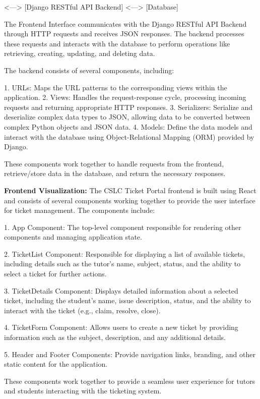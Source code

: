 \documentclass[oneside,openany,obeyspaces]{book}
\begin{document}
\begin{flushleft}
         <---> [Django RESTful API Backend] <---> [Database]

    The Frontend Interface communicates with the Django RESTful API Backend through HTTP requests and receives JSON responses. The backend processes these requests and interacts with the database to perform operations like retrieving, creating, updating, and deleting data.

    The backend consists of several components, including:

    1. URLs: Maps the URL patterns to the corresponding views within the application.
    2. Views: Handles the request-response cycle, processing incoming requests and returning appropriate HTTP responses.
    3. Serializers: Serialize and deserialize complex data types to JSON, allowing data to be converted between complex Python objects and JSON data.
    4. Models: Define the data models and interact with the database using Object-Relational Mapping (ORM) provided by Django.

    These components work together to handle requests from the frontend, retrieve/store data in the database, and return the necessary responses.

    \textbf{Frontend Visualization:}
    The CSLC Ticket Portal frontend is built using React and consists of several components working together to provide the user interface for ticket management. The components include:

    1. App Component: The top-level component responsible for rendering other components and managing application state.

    2. TicketList Component: Responsible for displaying a list of available tickets, including details such as the tutor's name, subject, status, and the ability to select a ticket for further actions.

    3. TicketDetails Component: Displays detailed information about a selected ticket, including the student's name, issue description, status, and the ability to interact with the ticket (e.g., claim, resolve, close).

    4. TicketForm Component: Allows users to create a new ticket by providing information such as the subject, description, and any additional details.

    5. Header and Footer Components: Provide navigation links, branding, and other static content for the application.

    These components work together to provide a seamless user experience for tutors and students interacting with the ticketing system.


\end{flushleft}
\end{document}
